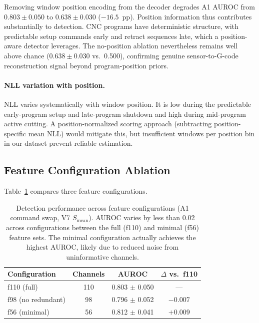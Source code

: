 Removing window position encoding from the decoder degrades A1 AUROC from $0.803 \pm 0.050$ to $0.638 \pm 0.030$ ($-16.5$~pp).
Position information thus contributes substantially to detection.
CNC programs have deterministic structure, with predictable setup commands early and retract sequences late, which a position-aware detector leverages.
The no-position ablation nevertheless remains well above chance ($0.638 \pm 0.030$ vs.\ 0.500), confirming genuine sensor-to-G-code reconstruction signal beyond program-position priors.

\paragraph{NLL variation with position.}
NLL varies systematically with window position.
It is low during the predictable early-program setup and late-program shutdown and high during mid-program active cutting.
A position-normalized scoring approach (subtracting position-specific mean NLL) would mitigate this, but insufficient windows per position bin in our dataset prevent reliable estimation.

\subsection{Feature Configuration Ablation}
\label{sec:ablation_features}

Table~\ref{tab:feature_config} compares three feature configurations.

\begin{table}[t]
\centering
\caption{Detection performance across feature configurations (A1 command swap, V7 $S_{\text{mean}}$). AUROC varies by less than 0.02 across configurations between the full (f110) and minimal (f56) feature sets. The minimal configuration actually achieves the highest AUROC, likely due to reduced noise from uninformative channels.}
\label{tab:feature_config}
\begin{tabular}{@{}lccc@{}}
\toprule
Configuration & Channels & AUROC & $\Delta$ vs.\ f110 \\
\midrule
f110 (full)       & 110 & 0.803 $\pm$ 0.050 & --- \\
f98 (no redundant) & 98  & 0.796 $\pm$ 0.052 & $-0.007$ \\
f56 (minimal)      & 56  & 0.812 $\pm$ 0.041 & $+0.009$ \\
\bottomrule
\end{tabular}
\end{table}


